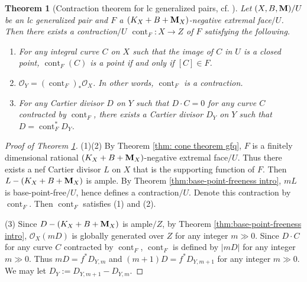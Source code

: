 \documentclass[11pt]{amsart}
\numberwithin{equation}{section}
\newcommand{\Mm}{{\bf{M}}}
\newcommand{\cont}{\operatorname{cont}}
\newtheorem{thm}{Theorem}[subsection]
\theoremstyle{definition}
\theoremstyle{definition}
\theoremstyle{definition}
\begin{document}
\begin{thm}[Contraction theorem for lc generalized pairs, cf. {\cite[Theorem 1.5]{Xie22}}]\label{thm: cont thm gpair}
Let $(X,B,\Mm)/U$ be an lc generalized pair and $F$ a $(K_X+B+\Mm_X)$-negative extremal face$/U$. Then there exists a contraction$/U$ $\cont_F: X\rightarrow Z$ of $F$ satisfying the following.
\begin{enumerate}
    \item For any integral curve $C$ on $X$ such that the image of $C$ in $U$ is a closed point, $\cont_F(C)$ is a point if and only if $[C]\in F$.
    \item $\mathcal{O}_Y=(\cont_F)_*\mathcal{O}_X$. In other words, $\cont_F$ is a contraction.
    \item For any Cartier divisor $D$ on $Y$ such that $D\cdot C=0$ for any curve $C$ contracted by $\cont_F$, there exists a Cartier divisor $D_Y$ on $Y$ such that $D=\cont_F^*D_Y$.
\end{enumerate}
\end{thm}
\begin{proof}[Proof of Theorem \ref{thm: cont thm gpair}]
(1)(2) By Theorem \ref{thm: cone theorem gfq},  $F$ is a finitely dimensional rational  $(K_X+B+\Mm_X)$-negative extremal face$/U$. Thus there exists a nef Cartier divisor $L$ on $X$ that is the supporting function of $F$. Then $L-(K_X+B+\Mm_X)$ is ample. By Theorem \ref{thm:base-point-freeness intro}, $mL$ is base-point-free$/U$, hence defines a contraction$/U$. Denote this contraction by $\cont_F$. Then $\cont_F$ satisfies (1) and (2).

(3) Since $D-(K_X+B+\Mm_X)$ is ample$/Z$, by Theorem \ref{thm:base-point-freeness intro}, $\mathcal{O}_X(mD)$ is globally generated over $Z$ for any integer $m\gg 0$. Since $D\cdot C$ for any curve $C$ contracted by $\cont_F$, $\cont_F$ is defined by $|mD|$ for any integer $m\gg 0$. Thus $mD=f^*D_{Y,m}$ and $(m+1)D=f^*D_{Y,m+1}$ for any integer $m\gg 0$. We may let $D_Y:=D_{Y,m+1}-D_{Y,m}$.
\end{proof}
\end{document}

